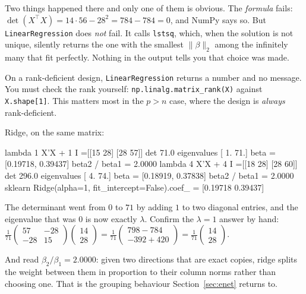 \documentclass[11pt]{article}
\newcommand{\XtX}{X^{\!\top}\!X}
\begin{document}
Two things happened there and only one of them is obvious. The
\emph{formula} fails: $\det(\XtX) = 14\cdot56 - 28^2 = 784 - 784 = 0$, and
NumPy says so. But \texttt{LinearRegression} does \emph{not} fail. It calls
\texttt{lstsq}, which, when the solution is not unique, silently returns the
one with the smallest $\|\beta\|_2$ among the infinitely many that fit
perfectly. Nothing in the output tells you that choice was made.

\begin{caution}
On a rank-deficient design, \texttt{LinearRegression} returns a number and no
message. You must check the rank yourself:
\texttt{np.linalg.matrix\_rank(X)} against \texttt{X.shape[1]}. This matters
most in the $p > n$ case, where the design is \emph{always} rank-deficient.
\end{caution}

Ridge, on the same matrix:

\begin{codeout}
  lambda 1   X'X + 1 I =[[15 28] [28 57]]   det   71.0   eigenvalues [ 1. 71.]
             beta = [0.19718, 0.39437]     beta2 / beta1 = 2.0000
  lambda 4   X'X + 4 I =[[18 28] [28 60]]   det  296.0   eigenvalues [ 4. 74.]
             beta = [0.18919, 0.37838]     beta2 / beta1 = 2.0000
sklearn Ridge(alpha=1, fit_intercept=False).coef_ = [0.19718 0.39437]
\end{codeout}

The determinant went from $0$ to $71$ by adding $1$ to two diagonal entries,
and the eigenvalue that was $0$ is now exactly $\lambda$. Confirm the
$\lambda = 1$ answer by hand:
$\frac{1}{71}\left(\begin{smallmatrix}57&-28\\-28&15\end{smallmatrix}\right)
\left(\begin{smallmatrix}14\\28\end{smallmatrix}\right)
= \frac{1}{71}\left(\begin{smallmatrix}798-784\\-392+420\end{smallmatrix}\right)
= \frac{1}{71}\left(\begin{smallmatrix}14\\28\end{smallmatrix}\right)$.

And read $\beta_2/\beta_1 = 2.0000$: given two directions that are exact
copies, ridge splits the weight between them in proportion to their column
norms rather than choosing one. That is the grouping behaviour
Section~\ref{sec:enet} returns to.
\end{document}
